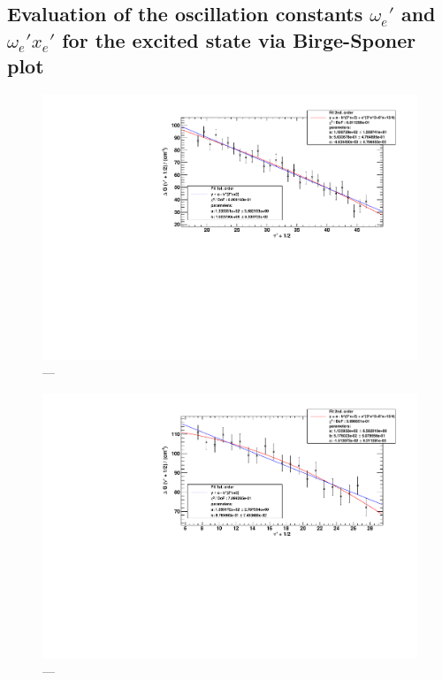 

\subsection{Evaluation of the oscillation constants $\omega_e'$ and $\omega_e' x_e'$ for the excited state
via Birge-Sponer plot}


\begin{figure}[H]
\begin{center}
  \includegraphics[width=\textwidth]{../img/prog1_birgesponer.pdf}
  \caption[---]{---}
  \label{img:prog1}
\end{center}
\end{figure}


\begin{figure}[H]
\begin{center}
  \includegraphics[width=\textwidth]{../img/prog2_birgesponer.pdf}
  \caption[---]{---}
  \label{img:prog2}
\end{center}
\end{figure}


